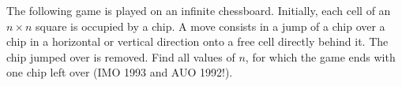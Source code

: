 The following game is played on an infinite chessboard. Initially, each cell of an $n \times n$ square is occupied by a chip. A move consists in a jump of a chip over a chip in a horizontal or vertical direction onto a free cell directly behind it. The chip jumped over is removed. Find all values of $n$, for which the game ends with one chip left over (IMO 1993 and AUO 1992!).
